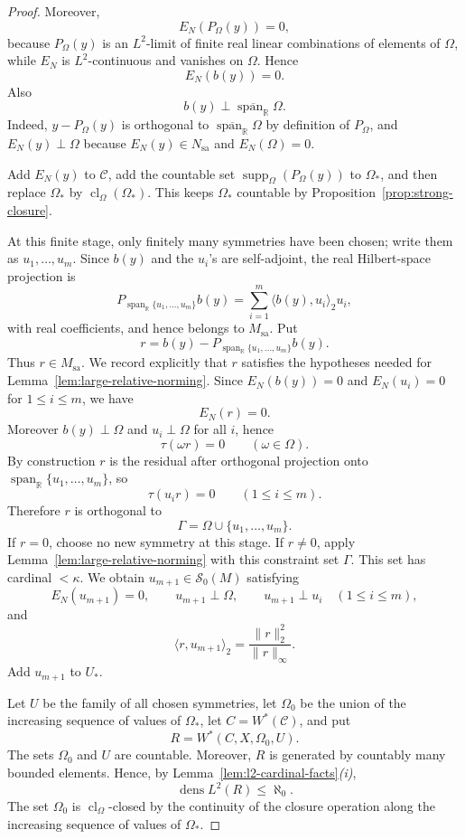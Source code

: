\documentclass[11pt,letterpaper,reqno]{amsart}
\theoremstyle{definition}
\numberwithin{equation}{section}
\newcommand{\sa}{\mathrm{sa}}
\newcommand{\RR}{\mathbb R}
\newcommand{\cl}{\operatorname{cl}}
\DeclareMathOperator{\spanop}{span}
\DeclareMathOperator{\dens}{dens}
\DeclareMathOperator{\supp}{supp}
\begin{document}
\begin{proof}
Moreover,
\[
   E_N(P_\Omega(y))=0,
\]
because \(P_\Omega(y)\) is an \(L^2\)-limit of finite real linear combinations
of elements of \(\Omega\), while \(E_N\) is \(L^2\)-continuous and vanishes on
\(\Omega\).  Hence
\[
   E_N(b(y))=0.
\]
Also
\[
   b(y)\perp\overline{\spanop_{\RR}}\Omega.
\]
Indeed, \(y-P_\Omega(y)\) is orthogonal to
\(\overline{\spanop_{\RR}}\Omega\) by definition of \(P_\Omega\), and
\(E_N(y)\perp\Omega\) because \(E_N(y)\in N_{\sa}\) and \(E_N(\Omega)=0\).

Add $E_N(y)$ to $\mathcal C$, add the countable set $\supp_\Omega(P_\Omega(y))$ to $\Omega_*$, and then replace $\Omega_*$ by $\cl_\Omega(\Omega_*)$.  This keeps $\Omega_*$ countable by Proposition~\ref{prop:strong-closure}.

At this finite stage, only finitely many symmetries have been chosen; write
them as \(u_1,\ldots,u_m\).  Since \(b(y)\) and the \(u_i\)'s are
self-adjoint, the real Hilbert-space projection is
\[
   P_{\spanop_{\RR}\{u_1,\ldots,u_m\}}b(y)
   =
   \sum_{i=1}^m \langle b(y),u_i\rangle_2 u_i,
\]
with real coefficients, and hence belongs to \(M_{\sa}\).  Put
\[
   r=b(y)-P_{\spanop_{\RR}\{u_1,\ldots,u_m\}}b(y).
\]
Thus \(r\in M_{\sa}\).  We record explicitly that \(r\) satisfies the
hypotheses needed for Lemma~\ref{lem:large-relative-norming}.  Since
\(E_N(b(y))=0\) and \(E_N(u_i)=0\) for \(1\leq i\leq m\), we have
\[
   E_N(r)=0.
\]
Moreover \(b(y)\perp\Omega\) and \(u_i\perp\Omega\) for all \(i\), hence
\[
   \tau(\omega r)=0\qquad(\omega\in\Omega).
\]
By construction \(r\) is the residual after orthogonal projection onto
\(\spanop_{\RR}\{u_1,\ldots,u_m\}\), so
\[
   \tau(u_i r)=0\qquad(1\leq i\leq m).
\]
Therefore \(r\) is orthogonal to
\[
   \Gamma=\Omega\cup\{u_1,\ldots,u_m\}.
\]
If $r=0$, choose no new symmetry at this stage.  If $r\neq0$, apply
Lemma~\ref{lem:large-relative-norming} with this constraint set \(\Gamma\).
This set has cardinal $<\kappa$.  We obtain $u_{m+1}\in\mathcal S_0(M)$ satisfying
\[
   E_N(u_{m+1})=0,
   \qquad
   u_{m+1}\perp\Omega,
   \qquad
   u_{m+1}\perp u_i\quad(1\leq i\leq m),
\]
and
\[
   \langle r,u_{m+1}\rangle_2
   =\frac{\|r\|_2^2}{\|r\|_\infty}.
\]
Add $u_{m+1}$ to $U_*$.

Let $U$ be the family of all chosen symmetries, let $\Omega_0$ be the union of the increasing sequence of values of $\Omega_*$, let $C=W^*(\mathcal C)$, and put
\[
   R=W^*(C,X,\Omega_0,U).
\]
The sets \(\Omega_0\) and \(U\) are countable.  Moreover, \(R\) is generated
by countably many bounded elements.  Hence, by
Lemma~\ref{lem:l2-cardinal-facts}\emph{(i)},
\[
   \dens L^2(R)\leq\aleph_0 .
\]
The set \(\Omega_0\) is \(\cl_\Omega\)-closed by the continuity of the closure
operation along the increasing sequence of values of \(\Omega_*\).


\end{proof}
\end{document}
